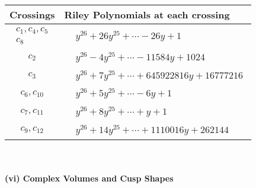 \documentclass[1p]{elsarticle_modified}
\theoremstyle{definition}
\begin{document}
\begin{tabular}{m{50pt}|m{274pt}}
Crossings & \hspace{64pt}Riley Polynomials at each crossing \\
\hline $$\begin{aligned}c_{1},c_{4},c_{5}\\c_{8}\end{aligned}$$&$\begin{aligned}
&y^{26}+26 y^{25}+\cdots-26 y+1
\end{aligned}$\\
\hline $$\begin{aligned}c_{2}\end{aligned}$$&$\begin{aligned}
&y^{26}-4 y^{25}+\cdots-11584 y+1024
\end{aligned}$\\
\hline $$\begin{aligned}c_{3}\end{aligned}$$&$\begin{aligned}
&y^{26}+7 y^{25}+\cdots+645922816 y+16777216
\end{aligned}$\\
\hline $$\begin{aligned}c_{6},c_{10}\end{aligned}$$&$\begin{aligned}
&y^{26}+5 y^{25}+\cdots-6 y+1
\end{aligned}$\\
\hline $$\begin{aligned}c_{7},c_{11}\end{aligned}$$&$\begin{aligned}
&y^{26}+8 y^{25}+\cdots+y+1
\end{aligned}$\\
\hline $$\begin{aligned}c_{9},c_{12}\end{aligned}$$&$\begin{aligned}
&y^{26}+14 y^{25}+\cdots+1110016 y+262144
\end{aligned}$\\
\hline
\end{tabular}\\~\\
\newpage\flushleft \textbf{(vi) Complex Volumes and Cusp Shapes}
\end{document}
